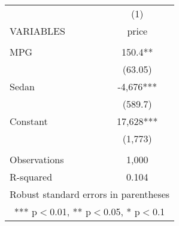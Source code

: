 \begin{tabular}{lc} \hline
 & (1) \\
VARIABLES & price \\ \hline
 &  \\
MPG & 150.4** \\
 & (63.05) \\
Sedan & -4,676*** \\
 & (589.7) \\
Constant & 17,628*** \\
 & (1,773) \\
 &  \\
Observations & 1,000 \\
 R-squared & 0.104 \\ \hline
\multicolumn{2}{c}{ Robust standard errors in parentheses} \\
\multicolumn{2}{c}{ *** p$<$0.01, ** p$<$0.05, * p$<$0.1} \\
\end{tabular}
